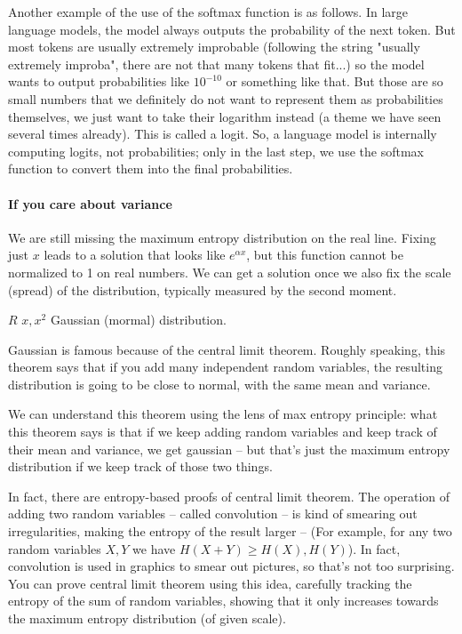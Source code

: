 \documentclass{article}
\begin{document}
Another example of the use of the softmax function is as follows. In large language models, the model always outputs the probability of the next token. But most tokens are usually extremely improbable (following the string "usually extremely improba", there are not that many tokens that fit...) so the model wants to output probabilities like $10^{-10}$ or something like that. But those are so small numbers that we definitely do not want to represent them as probabilities themselves, we just want to take their logarithm instead (a theme we have seen several times already). This is called a logit. So, a language model is internally computing logits, not probabilities; only in the last step, we use the softmax function to convert them into the final probabilities. 


\paragraph{If you care about variance}

We are still missing the maximum entropy distribution on the real line. Fixing just $x$ leads to a solution that looks like $e^{\alpha x}$, but this function cannot be normalized to 1 on real numbers. We can get a solution once we also fix the scale (spread) of the distribution, typically measured by the second moment. 

$R$                 $x, x^2$                Gaussian (mormal) distribution. 

Gaussian is famous because of the central limit theorem. Roughly speaking, this theorem says that if you add many independent random variables, the resulting distribution is going to be close to normal, with the same mean and variance. 

We can understand this theorem using the lens of max entropy principle: what this theorem says is that if we keep adding random variables and keep track of their mean and variance, we get gaussian -- but that's just the maximum entropy distribution if we keep track of those two things. 

In fact, there are entropy-based proofs of central limit theorem. The operation of adding two random variables -- called convolution -- is kind of smearing out irregularities, making the entropy of the result larger -- (For example, for any two random variables $X,Y$ we have $H(X+Y) \ge H(X), H(Y)$). In fact, convolution is used in graphics to smear out pictures, so that's not too surprising. You can prove central limit theorem using this idea, carefully tracking the entropy of the sum of random variables, showing that it only increases towards the maximum entropy distribution (of given scale). 
\end{document}
